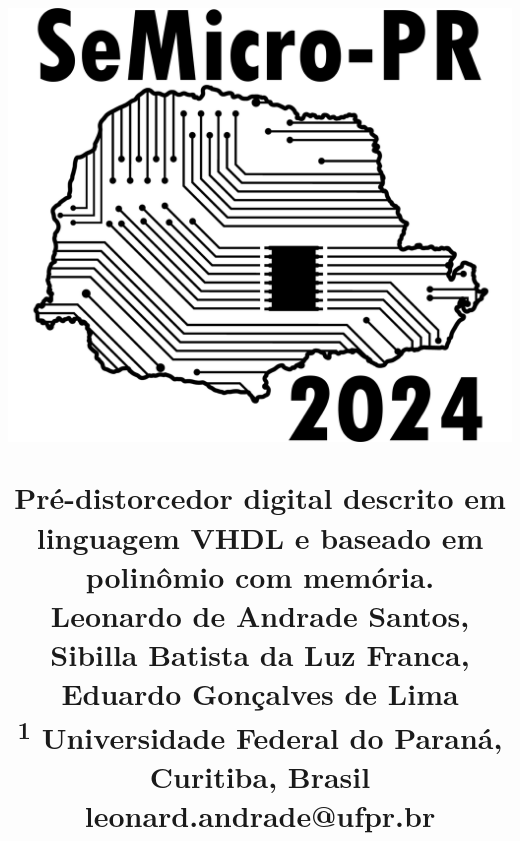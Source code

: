 \renewcommand{\thesubsection}{\Alph{subsection}}
\renewcommand{\thesection}{\Roman{section}}
\renewcommand{\figurename}{Fig.}
\renewcommand{\tablename}{TABELA}
\graphicspath{{Figuras/}}
\usepackage{geometry}
 \geometry{
     a4paper,
     left=16mm,
     top=19mm,
     right=16mm,
     bottom=25.4mm
 }
\title{
    \begin{minipage}[c]{0.3\textwidth} 
          \includegraphics[width=\textwidth]{Semicro_title.png} 
    \end{minipage}\begin{minipage}[c]{0.7\textwidth} 
             \begin{center}
                \Huge
                 Pré-distorcedor digital descrito em linguagem VHDL e baseado em polinômio com memória.\\
                \vspace{20pt}
                \Large
                  Leonardo de Andrade Santos, Sibilla Batista da Luz Franca, Eduardo Gonçalves de Lima \\
                  \normalsize
                  \textsuperscript{1} Universidade Federal do Paraná, Curitiba, Brasil \\
                  leonard.andrade@ufpr.br
             \end{center}
    \end{minipage}
}

\date{\vspace{-8em}}
\setlength\columnsep{2em}


